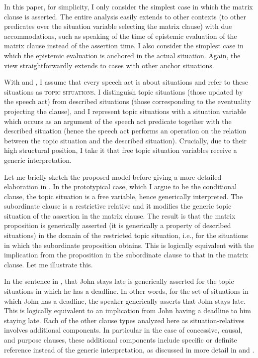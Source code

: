 \documentclass[output=paper,
colorlinks,
citecolor=brown,
newtxmath
]{langscibook}
\begin{document}
\noindent In this paper, for simplicity, I only consider the simplest case in which the matrix clause is asserted. The entire analysis easily extends to other contexts (to other predicates over the situation variable selecting the matrix clause) with due accommodations, such as speaking of the time of epistemic evaluation of the matrix clause instead of the assertion time. I also consider the simplest case in which the epistemic evaluation is anchored in the actual situation. Again, the view straightforwardly extends to cases with other anchor situations.

With \citet{Barwise.Perry1983} and \citet{Kratzer2010}, I assume that every speech act is about situations and refer to these situations as \textsc{topic situations}. I distinguish topic situations (those updated by the speech act) from described situations (those corresponding to the eventuality projecting the clause), and I represent topic situations with a situation variable which occurs as an argument of the speech act predicate together with the described situation (hence the speech act performs an operation on the relation between the topic situation and the described situation). Crucially, due to their high structural position, I take it that free topic situation variables receive a generic interpretation.

Let me briefly sketch the proposed model before giving a more detailed elaboration in . In the prototypical case, which I argue to be the conditional clause, the topic situation is a free variable, hence generically interpreted. The subordinate clause is a restrictive relative and it modifies the generic topic situation of the assertion in the matrix clause. The result is that the matrix proposition is generically asserted (it is generically a property of described situations) in the domain of the restricted topic situation, i.e., for the situations in which the subordinate proposition obtains. This is logically equivalent with the implication from the proposition in the subordinate clause to that in the matrix clause. Let me illustrate this.

In the sentence in , that John stays late is generically asserted for the topic situations in which he has a deadline. In other words, for the set of situations in which John has a deadline, the speaker generically asserts that John stays late. This is logically equivalent to an implication from John having a deadline to him staying late. Each of the other clause types analyzed here as situation-relatives involves additional components. In particular in the case of concessive, causal, and purpose clauses, these additional components include specific or definite reference instead of the generic interpretation, as discussed in more detail in  and .
\end{document}
